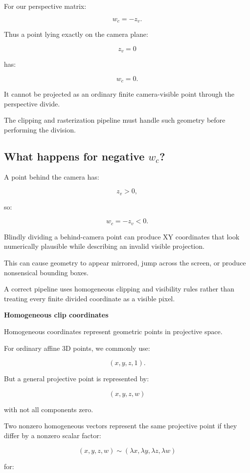 For our perspective matrix:

\[
 w_c=-z_v.
\]

Thus a point lying exactly on the camera plane:

\[
 z_v=0
\]

has:

\[
 w_c=0.
\]

It cannot be projected as an ordinary finite camera-visible point through the perspective divide.

The clipping and rasterization pipeline must handle such geometry before performing the division.

\subsection{\texorpdfstring{What happens for negative \(w_c\)?}{What happens for negative w\_c?}}\label{02-foundations-ii-ch033-what-happens-for-negative-w_c}

A point behind the camera has:

\[
 z_v>0,
\]

so:

\[
 w_c=-z_v<0.
\]

Blindly dividing a behind-camera point can produce XY coordinates that look numerically plausible while describing an invalid visible projection.

This can cause geometry to appear mirrored, jump across the screen, or produce nonsensical bounding boxes.

A correct pipeline uses homogeneous clipping and visibility rules rather than treating every finite divided coordinate as a visible pixel.

\textbf{Homogeneous clip coordinates}

Homogeneous coordinates represent geometric points in projective space.

For ordinary affine 3D points, we commonly use:

\[
 (x,y,z,1).
\]

But a general projective point is represented by:

\[
 \boxed{ (x,y,z,w) }
\]

with not all components zero.

Two nonzero homogeneous vectors represent the same projective point if they differ by a nonzero scalar factor:

\[
 \boxed{ (x,y,z,w) \sim (\lambda x,\lambda y,\lambda z,\lambda w) }
\]

for:

